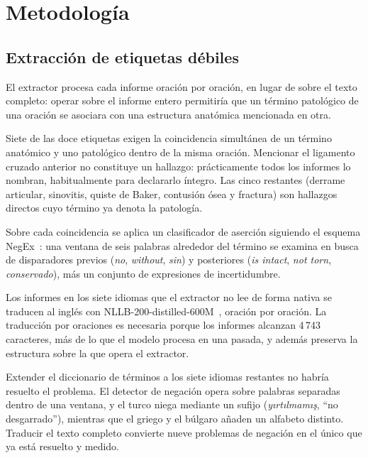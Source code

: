 \documentclass{article}
\begin{document}
\section{Metodología}

\subsection{Extracción de etiquetas débiles}

El extractor procesa cada informe oración por oración, en lugar de sobre el texto
completo: operar sobre el informe entero permitiría que un término patológico de
una oración se asociara con una estructura anatómica mencionada en otra.

Siete de las doce etiquetas exigen la coincidencia simultánea de un término
anatómico y uno patológico dentro de la misma oración. Mencionar el ligamento
cruzado anterior no constituye un hallazgo: prácticamente todos los informes lo
nombran, habitualmente para declararlo íntegro. Las cinco restantes (derrame
articular, sinovitis, quiste de Baker, contusión ósea y fractura) son hallazgos
directos cuyo término ya denota la patología.

Sobre cada coincidencia se aplica un clasificador de aserción siguiendo el
esquema NegEx~\citep{chapman2001simple}: una ventana de seis palabras alrededor
del término se examina en busca de disparadores previos (\emph{no},
\emph{without}, \emph{sin}) y posteriores (\emph{is intact}, \emph{not torn},
\emph{conservado}), más un conjunto de expresiones de incertidumbre.

Los informes en los siete idiomas que el extractor no lee de forma nativa se
traducen al inglés con NLLB-200-distilled-600M~\citep{nllb2022}, oración por
oración. La traducción por oraciones es necesaria porque los informes alcanzan
4\,743 caracteres, más de lo que el modelo procesa en una pasada, y además
preserva la estructura sobre la que opera el extractor.

Extender el diccionario de términos a los siete idiomas restantes no habría
resuelto el problema. El detector de negación opera sobre palabras separadas
dentro de una ventana, y el turco niega mediante un sufijo
(\emph{yırtılmamış}, ``no desgarrado''), mientras que el griego y el búlgaro
añaden un alfabeto distinto. Traducir el texto completo convierte nueve problemas
de negación en el único que ya está resuelto y medido.
\end{document}
